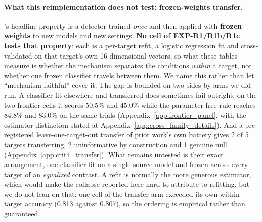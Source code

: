 \paragraph{What this reimplementation does not test: frozen-weights transfer.} \citet{pacchiardi2024catch}'s headline property is a detector trained \emph{once} and then applied with \textbf{frozen weights} to new models and new settings. \textbf{No cell of EXP-R1/R1b/R1c tests that property}: each is a per-target refit, a logistic regression fit and cross-validated on that target's own 16-dimensional vectors, so what these tables measure is whether the mechanism separates the conditions \emph{within} a target, not whether one frozen classifier travels between them. We name this rather than let ``mechanism-faithful'' cover it. The gap is bounded on two sides by arms we did run. A classifier fit elsewhere and transferred does sometimes fail outright: on the two frontier cells it scores 50.5\% and 45.0\% while the parameter-free rule reaches 84.8\% and 83.0\% on the same trials (Appendix~\ref{app:frontier_panel}, with the estimator distinction stated at Appendix~\ref{app:cross_family_details}). And a pre-registered leave-one-target-out transfer of prior work's own battery gives 2 of 5 targets transferring, 2 uninformative by construction and 1 genuine null (Appendix~\ref{app:crit4_transfer}). What remains untested is their exact arrangement, one classifier fit on a single source model and frozen across every target of an \emph{equalized} contrast. A refit is normally the more generous estimator, which would make the collapse reported here hard to attribute to refitting, but we do not lean on that: one cell of the transfer arm exceeded its own within-target accuracy (0.813 against 0.807), so the ordering is empirical rather than guaranteed.

